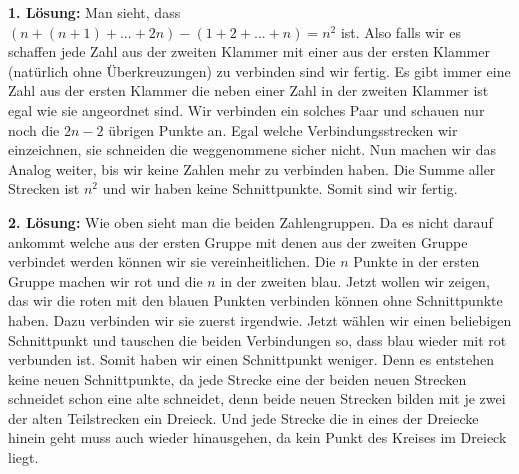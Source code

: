 \documentclass[language=german,style=solution]{smo}
\begin{document}
\begin{enumerate}[label=\textbf{\arabic*.}]
\textbf{1. Lösung:}
Man sieht, dass $(n+(n+1)+...+2n) - (1+2+...+n) = n^2$ ist. Also falls wir es schaffen jede Zahl aus der zweiten Klammer mit einer aus der ersten Klammer (natürlich ohne Überkreuzungen) zu verbinden sind wir fertig. Es gibt immer eine Zahl aus der ersten Klammer die neben einer Zahl in der zweiten Klammer ist egal wie sie angeordnet sind. Wir verbinden ein solches Paar und schauen nur noch die $2n-2$ übrigen Punkte an. Egal welche Verbindungsstrecken wir einzeichnen, sie schneiden die weggenommene sicher nicht. Nun machen wir das Analog weiter, bis wir keine Zahlen mehr zu verbinden haben. Die Summe aller Strecken ist $n^2$ und wir haben keine Schnittpunkte. Somit sind wir fertig.

\textbf{2. Lösung:}
Wie oben sieht man die beiden Zahlengruppen. Da es nicht darauf ankommt welche aus der ersten Gruppe mit denen aus der zweiten Gruppe verbindet werden können wir sie vereinheitlichen. Die $n$ Punkte in der ersten Gruppe machen wir rot und die $n$ in der zweiten blau. Jetzt wollen wir zeigen, das wir die roten mit den blauen Punkten verbinden können ohne Schnittpunkte haben. Dazu verbinden wir sie zuerst irgendwie. Jetzt wählen wir einen beliebigen Schnittpunkt und tauschen die beiden Verbindungen so, dass blau wieder mit rot verbunden ist. Somit haben wir einen Schnittpunkt weniger. Denn es entstehen keine neuen Schnittpunkte, da jede Strecke eine der beiden neuen Strecken schneidet schon eine alte schneidet, denn beide neuen Strecken bilden mit je zwei der alten Teilstrecken ein Dreieck. Und jede Strecke die in eines der Dreiecke hinein geht muss auch wieder hinausgehen, da kein Punkt des Kreises im Dreieck liegt.


\end{enumerate}
\end{document}
